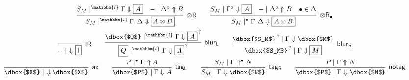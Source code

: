 \documentclass[runningheads]{llncs}
\renewcommand{\vec}{\overrightarrow}
\newcommand{\tr}{\otimes \mathsf{R}}
\newcommand{\lleft}{{\multimap}\mathsf{L}}
\newcommand{\M}{\mathsf{M}}
\newcommand{\unitr}{\mathsf{IR}}
\newcommand{\otR}{\tr}
\newcommand{\IR}{\unitr}
\newcommand{\ax}{\mathsf{ax}}
\newcommand{\ot}{\otimes}
\newcommand{\lolli}{\multimap}
\newcommand{\I}{\mathsf{I}}
\newcommand{\up}{\Uparrow}
\newcommand{\dn}{\Downarrow}
\newcommand{\blurL}{\mathsf{blur_L}}
\newcommand{\blurR}{\mathsf{blur_R}}
\renewcommand{\l}{\mathbbm{l}}
\newcommand{\tagL}{\mathsf{tag_L}}
\newcommand{\tagR}{\mathsf{tag_R}}
\newcommand{\tagM}{\mathsf{notag}}
\begin{document}
\begin{equation}
\begin{array}{c}
{    }
        \\[6pt]
    \infer[\otR]{S_M \mid^\l \Gamma , \Delta \dn \fbox{$A \ot B$}}{
      S_M \mid^\l \Gamma \dn \fbox{$A$}
      &
      - \mid \Delta^\circ \up B
    }
    \qquad
    \infer[\otR_\bullet]{S_M \mid^{\bullet} \Gamma , \Delta \dn \fbox{$A \ot B$}}{
      S_M \mid \Gamma^{\circ} \dn \fbox{$A$}
      &
      - \mid \Delta^{\circ} \up B
      &
      \bullet \in \Delta
    }
    \\[6pt]
    \infer[\IR]{- \mid ~ \dn \fbox{$\I$}}{}
    \qquad
        \infer[\blurL]{\fbox{$Q$} \mid^\l \Gamma \dn \fbox{$A$}^{\,?}}{
      \dbox{$Q$} \mid^\l \Gamma \dn \fbox{$A$}^{\,?}
      }    
    \qquad
        \infer[\blurR]{\dbox{$S_M$}^{\,?} \mid \Gamma \dn \fbox{$M$}}{
      \dbox{$S_M$}^{\,?} \mid \Gamma \dn \dbox{$M$}
    }
    \\[6pt]
    \infer[\ax]{\dbox{$X$} \mid ~ \dn \dbox{$X$}}{}
    \qquad
    \infer[\tagL]{\dbox{$P$} \mid \Gamma \dn A}{
      P \mid^\bullet \Gamma \up A}
    \qquad
    \infer[\tagR]{S_M \mid \Gamma \dn \dbox{$N$}}{
      S_M \mid \Gamma \up^\bullet N }
    \qquad
    \infer[\tagM]{\dbox{$P$} \mid \Gamma \dn \dbox{$N$}}{
    P \mid \Gamma \up N}

\end{array}
\end{equation}
\end{document}
